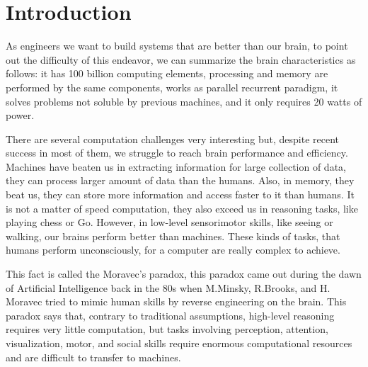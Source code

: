 \chapter{Introduction}\label{cap.introduccion}

\setlength{\parindent}{0pt}

%

As engineers we want to build systems that are better than our brain, to point out the difficulty of this endeavor, we can summarize the brain characteristics as follows: it has 100 billion computing elements, processing and memory are performed by the same components, works as parallel recurrent paradigm, it solves problems not soluble by previous machines, and it only requires 20 watts of power.


There are several computation challenges very interesting but, despite recent success in most of them, we struggle to reach brain performance and efficiency. Machines have beaten us in extracting information for large collection of data, they can process larger amount of data than the humans. Also, in memory, they beat us, they can store more information and access faster to it than humans. It is not a matter of speed computation, they also exceed us in reasoning tasks, like playing chess or Go. However, in low-level sensorimotor skills, like seeing or walking, our brains perform better than machines. These kinds of tasks, that humans perform unconsciously, for a computer are really complex to achieve.

This fact is called the Moravec's paradox, this paradox came out during the dawn of Artificial Intelligence back in the 80s when M.Minsky, R.Brooks, and H. Moravec tried to mimic human skills by reverse engineering on the brain. This paradox says that, contrary to traditional assumptions, high-level reasoning requires very little computation, but tasks involving  perception, attention, visualization, motor, and social skills require enormous computational resources and are difficult to transfer to machines.

